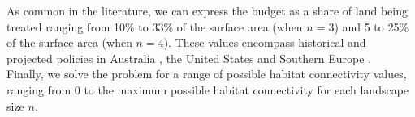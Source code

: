 As common in the literature, we can express the budget as a share of land being treated ranging from 10\% to 33\% of the surface area (when $n=3$) and 5 to 25\% of the surface area (when $n=4$). These values encompass historical and projected policies in Australia \citep{burrows2013}, the United States \citep{GAO2019} and Southern Europe \citep{Fernandes2013}.
\\
Finally, we solve the problem for a range of possible habitat connectivity values, ranging from $0$ to the maximum possible habitat connectivity for each landscape size $n$.



